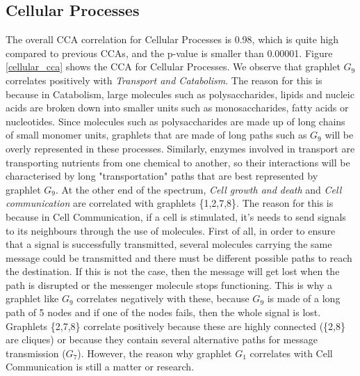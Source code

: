 \subsection{Cellular Processes}
\label{cca_kegg_cellular}

The overall CCA correlation for Cellular Processes is 0.98, which is quite high compared to previous CCAs, and the p-value is smaller than 0.00001.  Figure \ref{cellular_cca} shows the CCA for Cellular Processes. We observe that graphlet $G_9$ correlates positively with \emph{Transport and Catabolism}. The reason for this is because in Catabolism, large molecules such as polysaccharides, lipids and nucleic acids are broken down into smaller units such as monosaccharides, fatty acids or nucleotides. Since molecules such as polysaccharides are made up of long chains of small monomer units, graphlets that are made of long paths such as $G_9$ will be overly represented in these processes. Similarly, enzymes involved in transport are transporting nutrients from one chemical to another, so their interactions will be characterised by long "transportation" paths that are best represented by graphlet $G_9$. 
At the other end of the spectrum, \emph{Cell growth and death} and \emph{Cell communication} are correlated with graphlets \{1,2,7,8\}. The reason for this is because in Cell Communication, if a cell is stimulated, it's needs to send signals to its neighbours through the use of molecules. First of all, in order to ensure that a signal is successfully transmitted, several molecules carrying the same message could be transmitted and there must be different possible paths to reach the destination. If this is not the case, then the message will get lost when the path is disrupted or the messenger molecule stops functioning. This is why a graphlet like $G_9$ correlates negatively with these, because $G_9$ is made of a long path of 5 nodes and if one of the nodes fails, then the whole signal is lost. Graphlets \{2,7,8\} correlate positively because these are highly connected (\{2,8\} are cliques) or because they contain several alternative paths for message transmission ($G_7$). However, the reason why graphlet $G_
1$ correlates with Cell Communication is still a matter or research.


